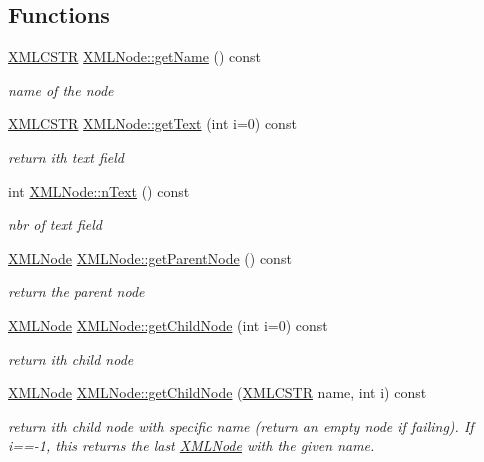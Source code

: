 \subsection*{Functions}
\begin{DoxyCompactItemize}
\item 
\hyperlink{xmlParser_8h_acdb0d6fd8dd596384b438d86cfb2b182}{X\-M\-L\-C\-S\-T\-R} \hyperlink{group__navigate_ga7e07715aa0ed894da96bd66c90d423f0}{X\-M\-L\-Node\-::get\-Name} () const 
\begin{DoxyCompactList}\small\item\em name of the node \end{DoxyCompactList}\item 
\hyperlink{xmlParser_8h_acdb0d6fd8dd596384b438d86cfb2b182}{X\-M\-L\-C\-S\-T\-R} \hyperlink{group__navigate_gaeb607292b18d4615b7c169c7c08c0a8b}{X\-M\-L\-Node\-::get\-Text} (int i=0) const 
\begin{DoxyCompactList}\small\item\em return ith text field \end{DoxyCompactList}\item 
int \hyperlink{group__navigate_ga22e7e7cf8f173a1ec3ec3d6ff60819d9}{X\-M\-L\-Node\-::n\-Text} () const 
\begin{DoxyCompactList}\small\item\em nbr of text field \end{DoxyCompactList}\item 
\hyperlink{structXMLNode}{X\-M\-L\-Node} \hyperlink{group__navigate_gad30a8420556e220742c681e353a875d8}{X\-M\-L\-Node\-::get\-Parent\-Node} () const 
\begin{DoxyCompactList}\small\item\em return the parent node \end{DoxyCompactList}\item 
\hyperlink{structXMLNode}{X\-M\-L\-Node} \hyperlink{group__navigate_ga77a21438b6d48a52cf8a1270f82f4475}{X\-M\-L\-Node\-::get\-Child\-Node} (int i=0) const 
\begin{DoxyCompactList}\small\item\em return ith child node \end{DoxyCompactList}\item 
\hyperlink{structXMLNode}{X\-M\-L\-Node} \hyperlink{group__navigate_gaf46d002a855acb46c18e47b70e686808}{X\-M\-L\-Node\-::get\-Child\-Node} (\hyperlink{xmlParser_8h_acdb0d6fd8dd596384b438d86cfb2b182}{X\-M\-L\-C\-S\-T\-R} name, int i) const 
\begin{DoxyCompactList}\small\item\em return ith child node with specific name (return an empty node if failing). If i==-\/1, this returns the last \hyperlink{structXMLNode}{X\-M\-L\-Node} with the given name. \end{DoxyCompactList}\item 

\end{DoxyCompactItemize}
